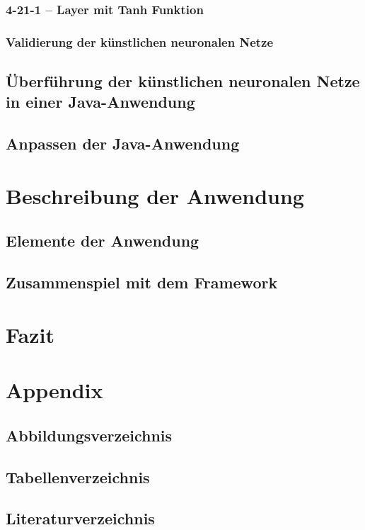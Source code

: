 \documentclass[11pt,a4paper]{scrreprt}
\begin{document}
	 \subsection{4-21-1 – Layer mit Tanh Funktion} %
  \subsection{Validierung der künstlichen neuronalen Netze} %
	\section{Überführung der künstlichen neuronalen Netze in einer Java-Anwendung} %
	\section{Anpassen der Java-Anwendung} %

\chapter{Beschreibung der Anwendung} %
 \section{Elemente der Anwendung} %
 \section{Zusammenspiel mit dem Framework} %

\chapter{Fazit} %

\chapter{Appendix}
\section{Abbildungsverzeichnis}
\section{Tabellenverzeichnis}
\section{Literaturverzeichnis}
\end{document}

